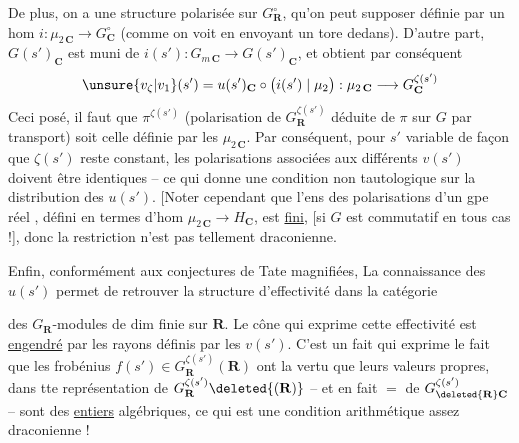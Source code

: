 De plus, on a une structure polarisée\inserted{ $\pi$} sur $G_{\mathbf R}^{\circ}$, qu'on peut  supposer définie par un hom  $i:\mu_{2\,\mathbf C}\longrightarrow G_{\mathbf C}^{\circ}$ (comme on voit en envoyant un tore  dedans). D'autre part, $G(s')_{\mathbf C}$ est muni de $i(s'):G_{m\,\mathbf C}\to G(s')_{\mathbf C}$, et  obtient par conséquent
\[
\unsure{v_{\zeta}|v_1}(s')=u(s')_{\mathbf C}\circ\bigl(i(s')\mid\mu_2\bigr):\mu_{2\,\mathbf C}\longrightarrow G_{\mathbf C}^{\zeta(s')}
\]
 Ceci posé, il faut que $\pi^{\zeta(s')}$ (polarisation de $G_{\mathbf R}^{\zeta(s')}$ déduite de $\pi$ sur $G$ par transport) soit celle définie par les $\mu_{2\,\mathbf C}$. Par conséquent, pour $s'$ variable de façon que $\zeta(s')$ reste constant, les polarisations  associées aux différents $v(s')$ doivent être identiques -- ce qui donne une condition non tautologique sur la distribution des  $u(s')$. [Noter cependant que l'ens des  polarisations d'un gpe réel , défini en termes d'hom $\mu_{2\,\mathbf C}\to H_{\mathbf C}$,  est \uline{fini}, [si $G$ est commutatif en tous cas !], donc la restriction n'est pas tellement draconienne.

Enfin, conformément aux conjectures de Tate magnifiées, La connaissance des $u(s')$ permet de retrouver la structure d'effectivité dans la catégorie

des $G_{\mathbf R}$-modules de dim finie sur $\mathbf R$. Le cône qui exprime cette effectivité est \uline{engendré} par les  rayons définis par les $v(s')$. C'est un fait qui exprime  le fait que les frobénius $f(s')\in G_{\mathbf R}^{\zeta(s')}(\mathbf R)$ ont la vertu que leurs valeurs propres, dans tte représentation de $G_{\mathbf R}^{\zeta(s')}\deleted{(\mathbf R)}$ -- et en fait $=$ de $G_{\deleted{\mathbf R}\mathbf C}^{\zeta(s')}$ -- sont des \uline{entiers} algébriques, ce qui est une condition arithmétique assez draconienne !

